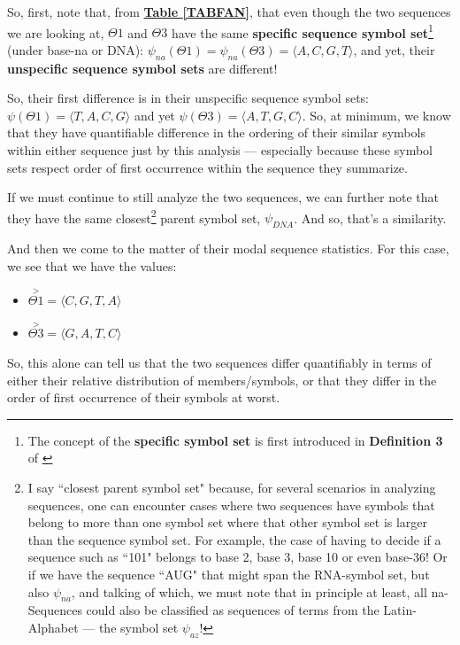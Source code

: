 \documentclass[a4paper, 18pt]{book} %
\begin{document}
So, first, note that, from \textbf{\hyperref[TABFAN]{Table \ref{TABFAN}}}, that even though the two sequences we are looking at, $\Theta1$ and $\Theta3$ have the same \textbf{specific sequence symbol set}\footnote{The concept of the \textbf{specific symbol set} is first introduced in \textbf{Definition 3} of \cite{ossipaper}} (under base-na or DNA): $\psi_{na}(\Theta1) = \psi_{na}(\Theta3) = \langle A, C, G, T \rangle$, and yet, their \textbf{unspecific sequence symbol sets} are different! 

So, their first difference is in their unspecific sequence symbol sets: $\psi(\Theta1) = \langle T, A, C, G\rangle$ and yet $\psi(\Theta3) = \langle A, T, G, C\rangle$. So, at minimum, we know that they have quantifiable difference in the ordering of their similar symbols within either sequence just by this analysis --- especially because these symbol sets respect order of first occurrence within the sequence they summarize.

If we must continue to still analyze the two sequences, we can further note that they have the same closest\footnote{I say ``closest parent symbol set" because, for several scenarios in analyzing sequences, one can encounter cases where two sequences have symbols that belong to more than one symbol set where that other symbol set is larger than the sequence symbol set. For example, the case of having to decide if a sequence such as ``101" belongs to base 2, base 3, base 10 or even base-36! Or if we have the sequence ``AUG" that might span the RNA-symbol set, but also $\psi_{na}$, and talking of which, we must note that in principle at least, all na-Sequences could also be classified as sequences of terms from the Latin-Alphabet --- the symbol set $\psi_{az}$!} parent symbol set, $\psi_{DNA}$. And so, that's a similarity.

And then we come to the matter of their modal sequence statistics. For this case, we see that we have the values: 

\begin{itemize}
\item $\overset{>}{\Theta1} = \langle C, G, T, A \rangle$
\item $\overset{>}{\Theta3} = \langle G, A, T, C \rangle$
\end{itemize}

So, this alone can tell us that the two sequences differ quantifiably in terms of either their relative distribution of members/symbols, or that they differ in the order of first occurrence of their symbols at worst.
\end{document}
